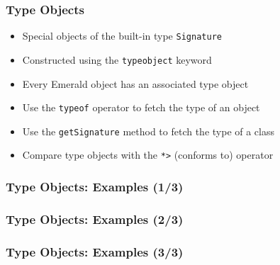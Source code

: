 \begin{frame}

\frametitle{Type Objects}

\begin{itemize}

\item Special objects of the built-in type \lstinline{Signature}

\item Constructed using the \lstinline{typeobject} keyword

\item Every Emerald object has an associated type object

\item Use the \lstinline{typeof} operator to fetch the type of an object

\item Use the \lstinline{getSignature} method to fetch the type of a class

\item Compare type objects with the \lstinline{*>} (conforms to)
operator

\end{itemize}

\end{frame}

\begin{frame}[fragile]

\frametitle{Type Objects: Examples (1/3)}



\end{frame}

\begin{frame}[fragile]

\frametitle{Type Objects: Examples (2/3)}



\end{frame}

\begin{frame}[fragile]

\frametitle{Type Objects: Examples (3/3)}



\end{frame}
